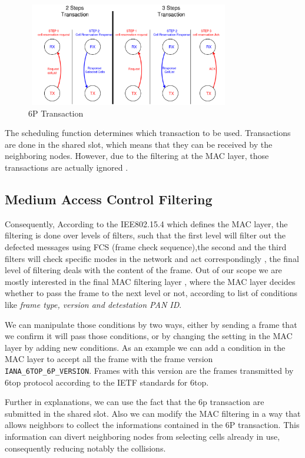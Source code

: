 \documentclass[10pt, conference, compsocconf]{IEEEtran}
\begin{document}
   

\begin{figure}[h]
    \centering
    \includegraphics[width=9cm, height=4.5cm]{2,3steps.png}
    \caption{6P Transaction}
    \label{fig:Collision in 6TiSCH Networks}
\end{figure}



The scheduling function determines which transaction to be used. Transactions are done in the shared slot, which means that they can be received by the neighboring nodes. However, due to the filtering at the MAC layer, those transactions are actually ignored .


\subsection{Medium Access Control Filtering}

Consequently, According to the IEE802.15.4 which defines the MAC layer, the filtering is done over levels of filters, such that the first level  will filter out the defected messages using FCS (frame check sequence),the second and the third filters will check specific modes in the network and act correspondingly , the final level of  filtering deals with the content of the frame. Out of our scope we are mostly interested in the final MAC filtering layer , where the MAC layer decides whether to pass the frame to the next level or not, according to list of conditions like {\em frame type, version and detestation PAN ID}.

We can manipulate those conditions by two ways, either by sending a frame that we confirm it will pass those conditions, or by changing the setting in the MAC layer  by adding new conditions. As an example we can add a condition in the MAC layer to accept all the frame with the frame version \verb|IANA_6TOP_6P_VERSION|. Frames with this version are the frames transmitted by 6top protocol according to the IETF standards for 6top.

Further in explanations, we can use the fact that the 6p transaction are submitted in the shared slot. Also we can modify the MAC filtering in a way that allows neighbors to collect the informations contained in the 6P transaction. This information can divert neighboring nodes from selecting cells already in use, consequently reducing notably the collisions.
\end{document}
